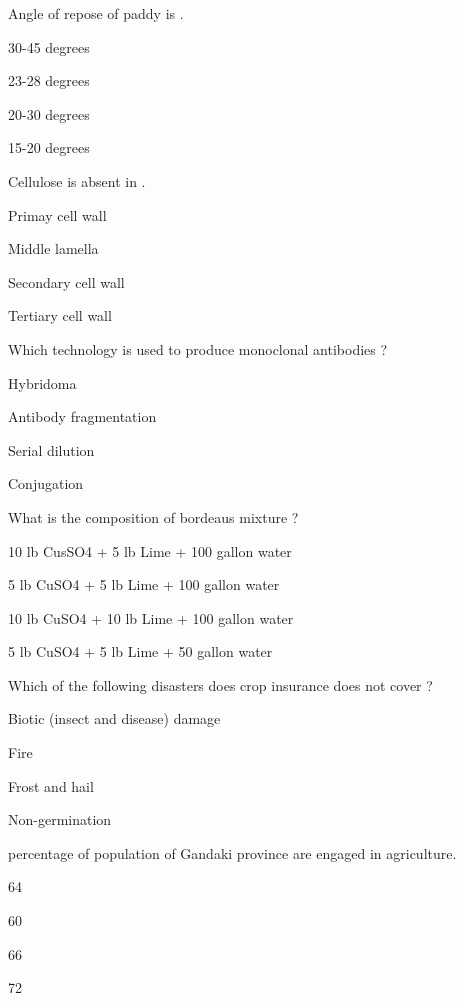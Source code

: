 \begin{questions}
\question Angle of repose of paddy is \fillin[][3cm].
\begin{items}
\item* 30-45 degrees
\item 23-28 degrees
\item 20-30 degrees
\item 15-20 degrees
\end{items}

\question Cellulose is absent in \fillin[][3cm].
\begin{items}
\item Primay cell wall
\item* Middle lamella
\item Secondary cell wall
\item Tertiary cell wall
\end{items}

\question Which technology is used to produce monoclonal antibodies ?
\begin{items}
\item* Hybridoma
\item Antibody fragmentation
\item Serial dilution
\item Conjugation
\end{items}

\question What is the composition of bordeaus mixture ?
\begin{items}
\item 10 lb CusSO4 + 5 lb Lime + 100 gallon water
\item 5 lb CuSO4 + 5 lb Lime + 100 gallon water
\item 10 lb CuSO4 + 10 lb Lime + 100 gallon water
\item* 5 lb CuSO4 + 5 lb Lime + 50 gallon water
\end{items}

\question Which of the following disasters does crop insurance does not cover ?
\begin{items}
\item Biotic (insect and disease) damage
\item Fire
\item Frost and hail
\item* Non-germination
\end{items}

\question \fillin[][3cm] percentage of population of Gandaki province are engaged in agriculture.
\begin{items}
\item* 64
\item 60
\item 66
\item 72
\end{items}


\end{questions}
